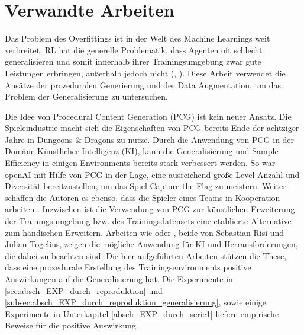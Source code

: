 \section{Verwandte Arbeiten}\label{hauptabschnitt_2}



Das Problem des Overfittings ist in der Welt des Machine Learnings weit verbreitet. RL hat die generelle Problematik, dass Agenten oft schlecht  generalisieren und somit innerhalb ihrer Trainingsumgebung zwar gute Leistungen erbringen, außerhalb jedoch nicht (\cite{cobbe2019procgen}, \cite{zhang2018study}). Diese Arbeit verwendet die Ansätze der prozeduralen Generierung und der Data Augmentation, um das Problem der Generalisierung zu untersuchen.

Die Idee von Procedural Content Generation (PCG) ist kein neuer Ansatz. Die Spieleindustrie macht sich die Eigenschaften von PCG bereits Ende der achtziger Jahre in \dq Dungeons \& Dragons\dq{} zu nutze. Durch die Anwendung von PCG in der Domäne Künstlicher Intelligenz (KI), kann die Generalisierung und Sample Efficiency in einigen Environments bereits stark verbessert werden. So war openAI mit Hilfe von PCG in der Lage, eine ausreichend große Level-Anzahl und Diversität bereitzustellen, um das Spiel \dq Capture the Flag\dq{} zu meistern. Weiter schaffen die Autoren es ebenso, dass die Spieler eines Teams in Kooperation arbeiten \cite{jaderberg2019human}. Inzwischen ist die Verwendung von PCG zur künstlichen Erweiterung der Trainingsumgebung bzw. des Trainingsdatensets eine etablierte Alternative zum händischen Erweitern. Arbeiten wie \cite{risi2019procedural} oder \cite{risi2019increasing}, beide von Sebastian Risi und Julian Togelius, zeigen die mögliche Anwendung für KI und Herrausforderungen, die dabei zu beachten sind. 
Die hier aufgeführten Arbeiten stützen die These, dass eine prozedurale Erstellung des Trainingsenvironments positive Auswirkungen auf die Generalisierung hat. Die Experimente in \ref{sec:absch_EXP_durch_reproduktion} und \ref{subsec:absch_EXP_durch_reproduktion_generalisierung}, sowie einige Experimente in Unterkapitel \ref{absch_EXP_durch_serie1} liefern empirische Beweise für die positive Auswirkung.

